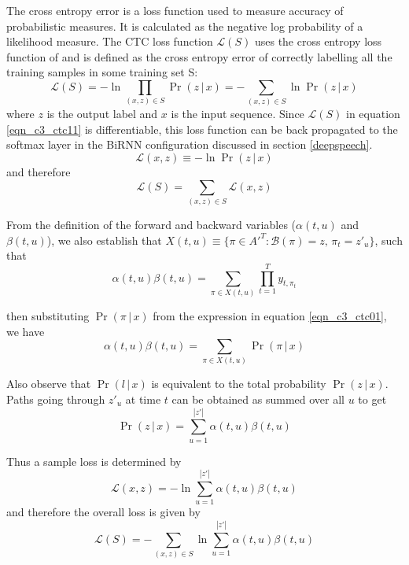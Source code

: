 The cross entropy error is a loss function used to measure accuracy of probabilistic measures.  It is calculated as the negative log probability of a likelihood measure.  The CTC loss function $\mathcal{L}(S)$ uses the cross entropy loss function of and is defined as the cross entropy error of correctly labelling all the training samples in some training set S:
\begin{equation}
\mathcal{L}(S) = - \ln \prod_{(x,z) \in S} \Pr(z \, | \, x) = - \sum_{(x,z) \in S} \ln \Pr(z \, | \, x)
\label{eqn_c3_ctc11}\end{equation}
where $z$ is the output label and $x$ is the input sequence.  Since $\mathcal{L}(S)$ in equation \ref{eqn_c3_ctc11} is differentiable, this loss function can be back propagated to the softmax layer in the BiRNN configuration discussed in section \ref{deepspeech}.
\begin{equation}
\mathcal{L}(x,z) \equiv - \ln \Pr(z \, | \, x)
\label{eqn_c3_ctc12}\end{equation}
and therefore 
\begin{equation}
\mathcal{L}(S) = \sum_{(x,z) \in S} \mathcal{L}(x,z)
\label{eqn_c3_ctc12}\end{equation}

From the definition of the forward and backward variables ($\alpha(t, u)$ and $\beta(t, u)$), we also establish that $X(t,u) \equiv \{ \pi \in A'^T : \mathcal{B}(\pi) = z, \, \pi_t = z'_u \}$, such that
\begin{equation}
\alpha(t, u) \beta(t, u) = \sum_{\pi \in X(t,u)} \prod_{t = 1}^{T} y_{t, \pi_t}\label{eqn_c3_ctc13}\end{equation}

then substituting $\Pr(\pi \, | \, x)$ from the expression in equation \ref{eqn_c3_ctc01}, we have
\begin{equation}
\alpha(t, u) \beta(t, u) = \sum_{\pi \in X(t,u)} \Pr(\pi \, | \, x)
\label{eqn_c3_ctc14}\end{equation}

Also observe that $\Pr(l \, | \, x)$ is equivalent to the total probability $\Pr(z \, | \, x)$. Paths going through $z'_u$ at time $t$ can be obtained as summed over all $u$ to get
\begin{equation}
\Pr(z \, | \, x) = \sum_{u = 1}^{|z'|} \alpha(t, u) \beta(t, u)
\label{eqn_c3_ctc15}\end{equation}

Thus a sample loss is determined by
\begin{equation}
\mathcal{L}(x, z) = - \ln \sum_{u = 1}^{|z'|} \alpha(t, u) \beta(t, u)\label{eqn_c3_ctc16}
\end{equation}
and therefore the overall loss is given by
\begin{equation}\mathcal{L}(S) = -\sum_{(x,z) \in S} \ln \sum_{u = 1}^{|z'|} \alpha(t, u) \beta(t, u)
\label{eqn_c3_ctc17}\end{equation}

